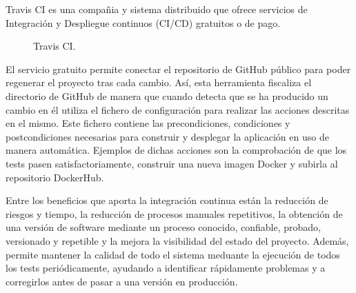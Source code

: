 Travis CI es una compañia y sistema distribuido que ofrece servicios de Integración y Despliegue continuos (CI/CD) gratuitos o de pago.

\begin{figure}[H]
\caption{Travis CI.\label{fig:figure_placement_example}}
\end{figure}

El servicio gratuito permite conectar el repositorio de GitHub público para poder regenerar el proyecto tras cada cambio. Así, esta herramienta fiscaliza el directorio de GitHub de manera que cuando detecta que se ha producido un cambio en él utiliza el fichero de configuración  para realizar las acciones descritas en el mismo. Este fichero contiene las precondiciones, condiciones y postcondiciones necesarias para construir y desplegar la aplicación en uso de manera automática. Ejemplos de dichas acciones son la comprobación de que los tests pasen satisfactoriamente, construir una nueva imagen Docker y subirla al repositorio DockerHub.

Entre los beneficios que aporta la integración continua están la reducción de riesgos y tiempo, la reducción de procesos manuales repetitivos, la obtención de una versión de software mediante un proceso conocido, confiable, probado, versionado y repetible y la mejora la visibilidad del estado del proyecto. Además, permite mantener la calidad de todo el sistema meduante la ejecución de todos los tests periódicamente, ayudando a identificar rápidamente problemas y a corregirlos antes de pasar a una versión en producción.

